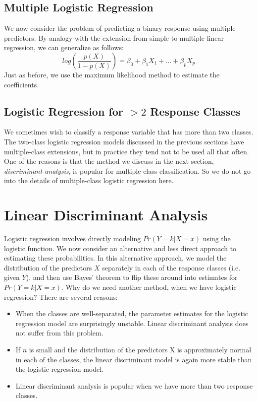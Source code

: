\subsection{Multiple Logistic Regression}
We now consider the problem of predicting a binary response using multiple predictors. By analogy with the extension from simple to multiple linear regression, we can generalize as follows:
\[log\left(\frac{p(X)}{1 - p(X)}\right) = \beta_0 + \beta_1 X_1 + ... + \beta_p X_p\]
Just as before, we use the maximum likelihood method to estimate the coefficients.

\subsection{Logistic Regression for $>2$ Response Classes}
We sometimes wish to classify a response variable that has more than two classes. The two-class logistic regression models discussed in the previous sections have multiple-class extensions, but in practice they tend not to be used all that often. One of the reasons is that the method we discuss in the next section, \textit{discriminant analysis}, is popular for multiple-class classification. So we do not go into the details of multiple-class logistic regression here.

\section{Linear Discriminant Analysis}
Logistic regression involves directly modeling $Pr(Y = k|X = x)$ using the logistic function. We now consider an alternative and less direct approach to estimating these probabilities. In this alternative approach, we model the distribution of the predictors $X$ separately in each of the response classes (i.e. given $Y$), and then use Bayes’ theorem to flip these around into estimates for $Pr(Y = k|X = x)$. Why do we need another method, when we have logistic regression? There are several reasons:
\begin{itemize}
    \item When the classes are well-separated, the parameter estimates for the logistic regression model are surprisingly unstable. Linear discriminant analysis does not suffer from this problem.

    \item If $n$ is small and the distribution of the predictors X is approximately normal in each of the classes, the linear discriminant model is again more stable than the logistic regression model.

    \item Linear discriminant analysis is popular when we have more than two response classes.
\end{itemize}


